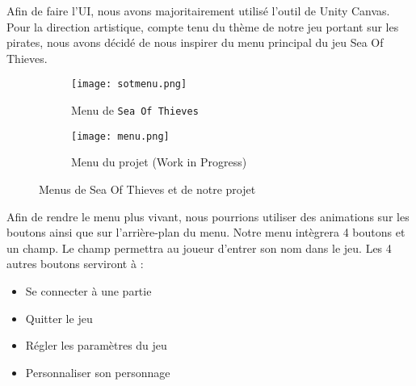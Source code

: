 \documentclass[../doc.tex]{subfiles}
\begin{document}
    Afin de faire l’UI, nous avons majoritairement utilisé l’outil de Unity Canvas. 
    Pour la direction artistique, compte tenu du thème de notre jeu portant sur les pirates, 
    nous avons décidé de nous inspirer du menu principal du jeu Sea Of Thieves. \newline
    
    \begin{figure}[hbt!]
        \centering
        \begin{subfigure}[t]{0.2\textwidth}
            \texttt{[image: sotmenu.png]} 
            \caption{Menu de \texttt{Sea Of Thieves}}
        \end{subfigure}
        \hspace{125pt}
        \begin{subfigure}[t]{0.3\textwidth}
            \texttt{[image: menu.png]}
            \caption{Menu du projet (Work in Progress)}
        \end{subfigure}
        \caption{Menus de Sea Of Thieves et de notre projet}
    \end{figure}
    
    Afin de rendre le menu plus vivant, 
    nous pourrions utiliser des animations sur les boutons ainsi que sur l’arrière-plan du menu.\newline 
    Notre menu intègrera 4 boutons et un champ. Le champ permettra au joueur d’entrer son nom dans le jeu. \newline
    Les 4 autres boutons serviront à :
    \begin{itemize}
        \item Se connecter à une partie
        \item Quitter le jeu
        \item Régler les paramètres du jeu
        \item Personnaliser son personnage
    \end{itemize}
\end{document}
